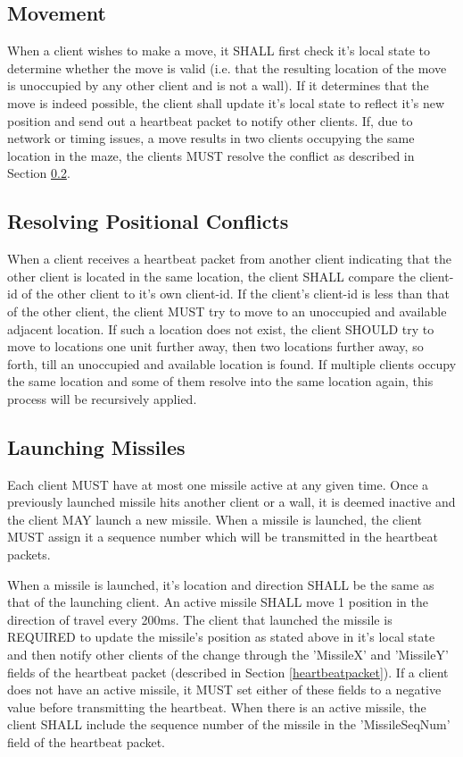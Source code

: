 \documentclass[11pt]{article} %
\begin{document}
\subsection{Movement}
\label{moveoperation}
When a client wishes to make a move, it SHALL first check it's local state to
determine whether the move is valid (i.e. that the resulting location of the
move is unoccupied by any other client and is not a wall). If it determines 
that the move is indeed possible, the client shall update it's local state to 
reflect it's new position and send out a heartbeat packet to notify other 
clients. If, due to network or timing issues, a move results in two clients 
occupying the same location in the maze, the clients MUST resolve the 
conflict as described in Section \ref{positionconflicts}.

\subsection{Resolving Positional Conflicts}
\label{positionconflicts}
When a client receives a heartbeat packet from another client indicating that
the other client is located in the same location, the client SHALL compare the
client-id of the other client to it's own client-id. If the client's client-id
is less than that of the other client, the client MUST try to move to an
unoccupied and available adjacent location. If such a location does not exist,
the client SHOULD try to move to locations one unit further away, then two
locations further away, so forth, till an unoccupied and available location is
found. If multiple clients occupy the same location and some of them resolve
into the same location again, this process will be recursively applied.

\subsection{Launching Missiles}
\label{launchoperation}
Each client MUST have at most one missile active at any given time. Once a
previously launched missile hits another client or a wall, it is deemed inactive
and the client MAY launch a new missile. When a missile is launched, the client
MUST assign it a sequence number which will be transmitted in the heartbeat
packets. 

	When a missile is launched, it's location and direction SHALL be the same as
that of the launching client. An active missile SHALL move 1 position in the
direction of travel every 200ms. 
The client that launched the missile is REQUIRED to update the missile's position as
stated above in it's local state and then notify other clients of the change
through the 'MissileX' and 'MissileY' fields of the heartbeat packet
(described in Section \ref{heartbeatpacket}). If a client does not have an
active missile, it MUST set either of these fields to a negative value
before transmitting the heartbeat. When there is an active missile, the
client SHALL include the sequence number of the missile in the
'MissileSeqNum' field of the heartbeat packet.
\end{document}
